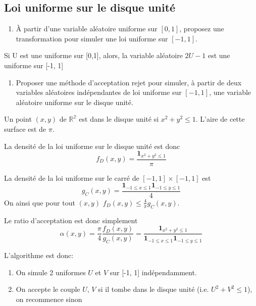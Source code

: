 \documentclass[]{article}
\providecommand{\tightlist}{%
  \setlength{\itemsep}{0pt}\setlength{\parskip}{0pt}}
\newenvironment{Correction}%
  { \vspace{\baselineskip}\begin{mdframed}[backgroundcolor=my_green]}%
  {\end{mdframed}}
\begin{document}
\hypertarget{loi-uniforme-sur-le-disque-unituxe9}{%
\subsection{Loi uniforme sur le disque
unité}\label{loi-uniforme-sur-le-disque-unituxe9}}

\begin{enumerate}
\def\labelenumi{\arabic{enumi}.}
\tightlist
\item
  À partir d'une variable aléatoire uniforme sur \([0, 1]\), proposez
  une transformation pour simuler une loi uniforme sur \([-1, 1]\).
\end{enumerate}

\begin{Correction}
Si U est une uniforme sur [0,1], alors, la variable aléatoire $2U - 1$ est une uniforme
sur [-1, 1]
\end{Correction}

\begin{enumerate}
\def\labelenumi{\arabic{enumi}.}
\setcounter{enumi}{1}
\tightlist
\item
  Proposer une méthode d'acceptation rejet pour simuler, à partir de
  deux variables aléatoires indépendantes de loi uniforme sur
  \([-1, 1]\), une variable aléatoire uniforme sur le disque unité.
\end{enumerate}

\begin{Correction}
Un point $(x, y)$ de $\mathbb{R^2}$ est dans le disque unité si $x^2 + y^2 \leq 1$.
L'aire de cette surface est de $\pi$.

La densité de la loi uniforme sur le disque unité est donc
$$f_D(x, y) = \frac{\mathbf{1}_{x^2 + y^2 \leq 1}}{\pi}$$

La densité de la loi uniforme sur le carré de $[-1, 1] \times [-1, 1]$ est
$$g_C(x, y) = \frac{\mathbf{1}_{-1\leq x \leq 1} \mathbf{1}_{-1 \leq y\leq 1}}{4}$$
On ainsi que pour tout $(x, y)$ $f_D(x, y) \leq \frac{4}{\pi} g_C(x, y)$.

Le ratio d'acceptation est donc simplement
$$\alpha(x, y) = \frac{\pi}{4}\frac{f_D(x, y)}{g_C(x, y)} = \frac{\mathbf{1}_{x^2 + y^2 \leq 1}}{\mathbf{1}_{-1\leq x \leq 1} \mathbf{1}_{-1 \leq y\leq 1}}$$

L'algorithme est donc:

\begin{enumerate}
\item On simule 2 uniformes $U$ et $V$ sur [-1, 1] indépendamment.
\item On accepte le couple $U$, $V$ si il tombe dans le disque unité (i.e. $U^2 + V^2 \leq 1$), on recommence sinon
\end{enumerate}

\end{Correction}
\end{document}
